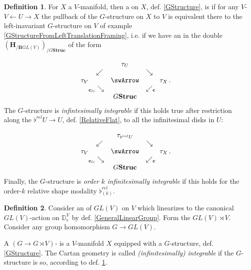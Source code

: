 \documentclass[12pt,titlepage]{article}
\def\mathllap{\mathpalette\mathllapinternal}
\def\mathrlap{\mathpalette\mathrlapinternal}
\def\mathllapinternal#1#2{\llap{$\mathsurround=0pt#1{#2}$}}
\def\mathrlapinternal#1#2{\rlap{$\mathsurround=0pt#1{#2}$}}
\newcommand{\itexarray}[1]{\begin{matrix}#1\end{matrix}}
\theoremstyle{plain}
\theoremstyle{definition}
\newtheorem{defn}{Definition}
\theoremstyle{remark}
\begin{document}
\begin{defn}
\label{IntegrabilityOfGStructure}\hypertarget{IntegrabilityOfGStructure}{}
For $X$ a $V$-manifold, then a  on $X$, def. \ref{GStructure}, is  if for any $V$- $V \leftarrow U \rightarrow X$ the pullback of the $G$-structure on $X$ to $V$ is equivalent there to the left-inavariant $G$-structure on $V$ of example \ref{GStructureFromLeftTranslationFraming}, i.e. if we have an  in the double  $(\mathbf{H}_{/\mathbf{B}GL(V)})_{/G\mathbf{Struc}}$ of the form

\begin{displaymath}
\itexarray{
     && \tau_U
     \\
     & \swarrow && \searrow
     \\
     \tau_V && \swArrow && \tau_X
     \\
     & {}_{\mathllap{\mathbf{c}_{li}}}\searrow && \swarrow_{\mathrlap{\mathbf{c}}}
     \\
     && G \mathbf{Struc}
  }
  \,.
\end{displaymath}
The $G$-structure is \emph{infintesimally integrable} if this holds true after restriction along the  $\flat^{rel} U \to U$, def. \ref{RelativeFlat}, to all the infinitesimal disks in $U$:

\begin{displaymath}
\itexarray{
     && \tau_{\flat^{rel}U}
     \\
     & \swarrow && \searrow
     \\
     \tau_V && \swArrow && \tau_X
     \\
     & {}_{\mathllap{\mathbf{c}_{li}}}\searrow && \swarrow_{\mathrlap{\mathbf{c}}}
     \\
     && G \mathbf{Struc}
  }
  \,.
\end{displaymath}
Finally, the $G$-structure is \emph{order $k$ infinitesimally integrable} if this holds for the order-$k$ relative shape modality $\flat^{rel}_{(k)}$.

\end{defn}
\begin{defn}
\label{CartanGeometry}\hypertarget{CartanGeometry}{}
Consider an  of $GL(V)$ on $V$ which linearizes to the canonical $GL(V)$-action on $\mathbb{D}^V_e$ by def. \ref{GeneralLinearGroup}. Form the  $GL(V) \rtimes V$. Consider any group homomorphism $G\to GL(V)$.

A \emph{$(G\to G\rtimes V)$-} is a $V$-manifold $X$ equipped with a $G$-structure, def. \ref{GStructure}. The Cartan geometry is called \emph{(infinitesimally) integrable} if the $G$-structure is so, according to def. \ref{IntegrabilityOfGStructure}.

\end{defn}
\end{document}
